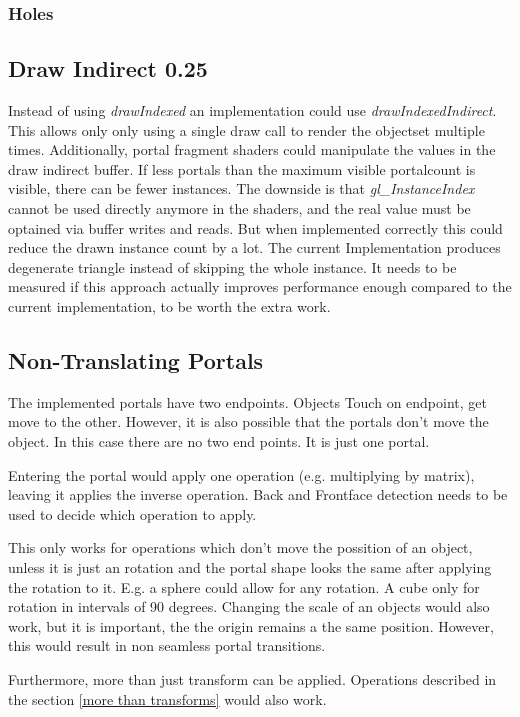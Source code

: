 \subsubsection{Holes}

\subsection{Draw Indirect 0.25}
Instead of using \textit{drawIndexed} an implementation could use \textit{drawIndexedIndirect}. This allows only only using a single draw call to render the \gls{objectset} multiple times. Additionally, portal fragment shaders could manipulate the values in the draw indirect buffer. If less portals than the maximum visible \gls{portalcount} is visible, there can be fewer instances. The downside is that \textit{gl\_InstanceIndex} cannot be used directly anymore in the shaders, and the real value must be optained via buffer writes and reads. But when implemented correctly this could reduce the drawn instance count by a lot. The current Implementation produces degenerate triangle instead of skipping the whole instance. It needs to be measured if this approach actually improves performance enough compared to the current implementation, to be worth the extra work.




\subsection{Non-Translating Portals}
The implemented portals have two endpoints. Objects Touch on endpoint, get move to the other. However, it is also possible that the portals don't move the object. In this case there are no two end points. It is just one portal.

Entering the portal would apply one operation (e.g. multiplying by matrix), leaving it applies the inverse operation. Back and Frontface detection needs to be used to decide which operation to apply.


This only works for operations which don't move the possition of an object, unless it is just an rotation and the portal shape looks the same after applying the rotation to it. E.g. a sphere could allow for any rotation. A cube only for rotation in intervals of 90 degrees.
Changing the scale of an objects would also work, but it is important, the the origin remains a the same position. However, this would result in non seamless portal transitions.

Furthermore, more than just transform can be applied. Operations described in the section \ref{more than transforms} would also work.


